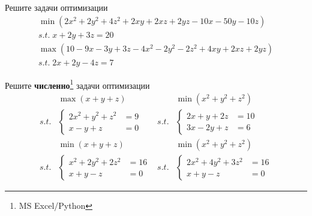 \begin{exercise}
Решите задачи оптимизации
\begin{gather*}
	\min(2x^2+2y^2+4z^2+2xy+2xz+2yz-10x-50y-10z) \\ 
	s.t.\;x+2y+3z=20 \\
	\max(10-9x-3y+3z-4x^2-2y^2-2z^2+4xy+2xz+2yz) \\
	s.t.\; 2x+2y-4z=7
\end{gather*}
\end{exercise}

\begin{exercise}
Решите \textbf{численно}\footnote{MS Excel/Python} задачи оптимизации
\begin{align*}
	&\max (x+y+z) & &\min(x^2+y^2+z^2) \\
	s.t.&\left\{\begin{aligned}
		2x^2+y^2+z^2 &= 9 \\ x-y+z&=0 
	\end{aligned}\right. &
	s.t.&\left\{\begin{aligned}
		2x+y+2z &= 10 \\ 3x-2y+z&=6 
	\end{aligned}\right. \\
	&\min (x+y+z) & &\min(x^2+y^2+z^2) \\
	s.t.&\left\{\begin{aligned}
		x^2+2y^2+2z^2 &= 16 \\ x+y-z&=0 
	\end{aligned}\right. &
	s.t.&\left\{\begin{aligned}
		2x^2+4y^2+3z^2 &= 16 \\ x+y-z&=0 
	\end{aligned}\right.
\end{align*}
\end{exercise}